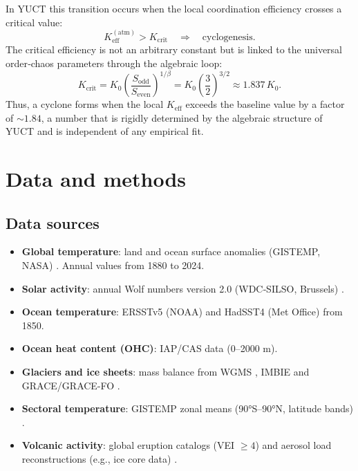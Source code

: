 \documentclass[12pt,a4paper]{article}
\newcommand{\Keff}{K_{\mathrm{eff}}}
\begin{document}
In YUCT this transition occurs when the local coordination efficiency crosses a
critical value:
\begin{equation}
	\Keff^{\mathrm{(atm)}} > K_{\mathrm{crit}} \quad \Longrightarrow \quad
	\text{cyclogenesis}.
\end{equation}
The critical efficiency is not an arbitrary constant but is linked to the
universal order‑chaos parameters through the algebraic loop:
\begin{equation}
	K_{\mathrm{crit}} = K_0 \left( \frac{S_{\mathrm{odd}}}{S_{\mathrm{even}}} \right)^{1/\beta}
	= K_0 \left( \frac{3}{2} \right)^{3/2} \approx 1.837\,K_0 .
\end{equation}
Thus, a cyclone forms when the local $K_{\mathrm{eff}}$ exceeds the baseline
value by a factor of $\sim 1.84$, a number that is rigidly determined by the
algebraic structure of YUCT and is independent of any empirical fit.

	\section{Data and methods}
	
	\subsection{Data sources}
	
	\begin{itemize}
		\item \textbf{Global temperature}: land and ocean surface anomalies (GISTEMP, NASA) \cite{GISTEMP}. Annual values from 1880 to 2024.
		\item \textbf{Solar activity}: annual Wolf numbers version 2.0 (WDC‑SILSO, Brussels) \cite{SILSO}.
		\item \textbf{Ocean temperature}: ERSSTv5 (NOAA) and HadSST4 (Met Office) \cite{ERSST, HADSST} from 1850.
		\item \textbf{Ocean heat content (OHC)}: IAP/CAS data \cite{IAPOHC} (0–2000 m).
		\item \textbf{Glaciers and ice sheets}: mass balance from WGMS \cite{WGMS}, IMBIE \cite{IMBIE} and GRACE/GRACE-FO \cite{GRACE}.
		\item \textbf{Sectoral temperature}: GISTEMP zonal means (90°S–90°N, latitude bands) \cite{GISTEMPZonal}.
		\item \textbf{Volcanic activity}: global eruption catalogs (VEI \(\ge 4\)) and aerosol load reconstructions (e.g., ice core data) \cite{VolcanoCatalog}.
	\end{itemize}
	
\end{document}
